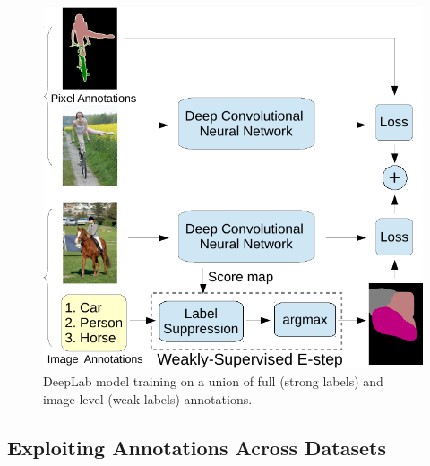 \begin{figure}[htbp!]
  \centering
  \includegraphics[width=0.9\linewidth]{fig/model_train_twoEnd.pdf} 
  \caption{DeepLab model training on a union of full (strong labels) 
    and image-level (weak labels) annotations.}
  \label{fig:model_illustrations_twoEnd}
\end{figure}

\subsection{Exploiting Annotations Across Datasets}



